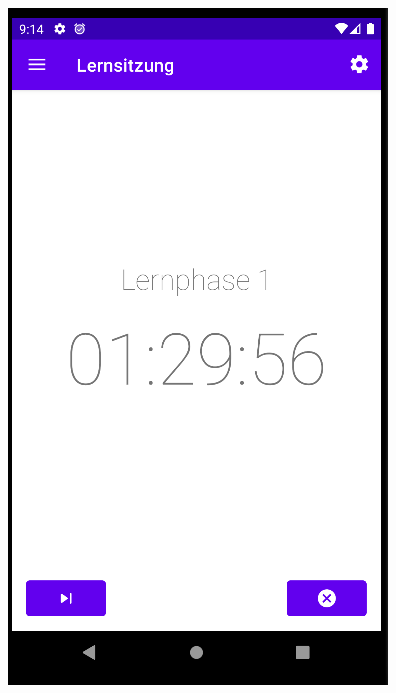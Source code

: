 \documentclass{article}
\begin{document}
\begin{center}
    \includegraphics[scale=0.45]{learn_screen.png}
\end{center}
\end{document}
